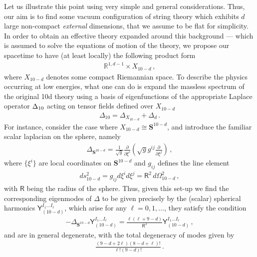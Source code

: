 Let us illustrate this point using very simple and general considerations. Thus, our aim is to find some vacuum configuration of string theory which exhibits $d$ large non-compact \emph{external} dimensions, that we assume to be flat for simplicity. In order to obtain an effective theory expanded around this background --- which is assumed to solve the equations of motion of the theory, we propose our spacetime to have (at least locally) the following product form
%
\begin{align}\label{prodansatz}
    \mathbb{R}^{1,d-1} \times X_{10-d}\, ,
\end{align}
%
where $X_{10-d}$ denotes some compact Riemannian space. To describe the physics occurring at low energies, what one can do is expand the massless spectrum of the original 10d theory using a basis of eigenfunctions of the appropriate Laplace operator $\Delta_{\rm 10}$ acting on tensor fields defined over $X_{10-d}$
%
\begin{align}
 \Delta_{10} = \Delta_{X_{10-d}} + \Delta_{d} \, .
\end{align}
%
For instance, consider the case where $X_{10-d} \cong \mathbf{S}^{10-d}$, and introduce the familiar scalar laplacian on the sphere, namely
%
\begin{align}\label{eq:scalarlaplaciansphere}
    \Delta_{\mathbf{S}^{10-d}} = \frac{1}{\sqrt{g}} \frac{\partial}{\partial \xi^i} \left( \sqrt{g} g^{ij} \frac{\partial}{\partial \xi^j}\right)\, ,
\end{align}
%
where $\{\xi^i\}$ are local coordinates on $\mathbf{S}^{10-d}$ and $g_{ij}$ defines the line element
%
\begin{align}\label{eq:lineelementsphere}
    ds^2_{10-d}= g_{ij} d\xi^i d\xi^j = \mathsf{R}^2\, d\Omega^2_{10-d}\, ,
\end{align}
%
with $\mathsf{R}$ being the radius of the sphere. Thus, given this set-up we find the corresponding eigenmodes of $\Delta$ to be given precisely by the (scalar) spherical harmonics $\mathsf{Y}_{(10-d)}^{I_1 \ldots I_\ell}$, which arise for any $\ell=0,1,\ldots$, they satisfy the condition
%
\begin{align}\label{eq:harmonics}
    -\Delta_{\mathbf{S}^{10-d}} \mathsf{Y}_{(10-d)}^{I_1 \ldots I_\ell} = \frac{\ell (\ell+9-d)}{\mathsf{R}^2} \mathsf{Y}_{(10-d)}^{I_1 \ldots I_\ell}\, ,
\end{align}
%
and are in general degenerate, with the total degeneracy of modes given by
%
\begin{align}\label{eq:deg10-dsphere}
    \frac{(9-d+2\ell)(8-d+\ell)!}{\ell! (9-d)!}\, .
\end{align}
